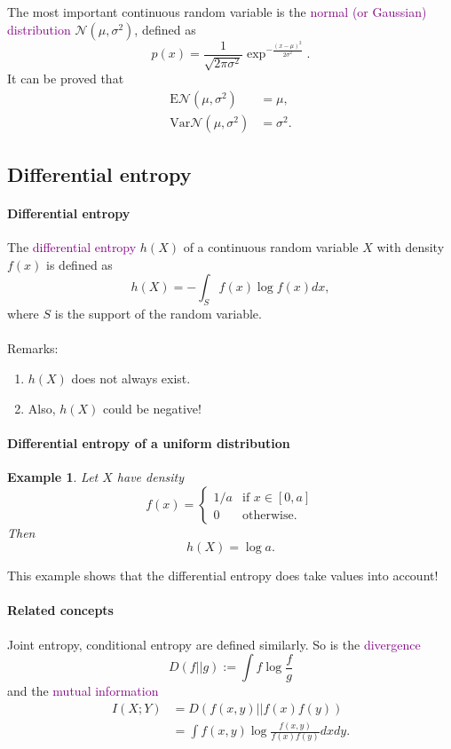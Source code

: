 \documentclass[a4paper, 11pt, openany]{book}
\numberwithin{equation}{section}
\theoremstyle{plain}
\newtheorem{example}	[equation]	{Example}
\theoremstyle{definition}
\newcommand{\Define}[1]{\textcolor{purple}{#1}}
\newcommand{\alphabet}[1]{\mathcal{#1}}
\begin{document}
The most important continuous random variable is the \Define{normal (or Gaussian) distribution} $\alphabet{N}(\mu, \sigma^2)$, defined as
\[
	p(x) = \frac{1}{\sqrt{2 \pi \sigma^2}} \exp^{- \frac{(x-\mu)^2}{2 \sigma^2}}.
\]
It can be proved that
\begin{align*}
	\mathrm{E} \alphabet{N}(\mu, \sigma^2) &= \mu,\\
	\mathrm{Var} \alphabet{N}(\mu, \sigma^2) &= \sigma^2.
\end{align*}




\subsection{Differential entropy}

\paragraph{Differential entropy}

The \Define{differential entropy} $h(X)$ of a continuous random variable $X$ with density $f(x)$ is defined as
\[
	h(X) = - \int_S f(x) \log f(x) dx,
\]
where $S$ is the support of the random variable.\\
~\\
Remarks:
\begin{enumerate}
	\item $h(X)$ does not always exist.
	
	\item Also, $h(X)$ could be negative!
\end{enumerate}




\paragraph{Differential entropy of a uniform distribution}
\begin{example}
Let $X$ have density
\[
	f(x) = \begin{cases}
	1/a & \mbox{if } x \in [0,a]\\
	0 & \mbox{otherwise}.
	\end{cases}
\]
Then
\[
	h(X) = \log a.
\]
\end{example}

This example shows that the differential entropy does take values into account!



\paragraph{Related concepts}
Joint entropy, conditional entropy are defined similarly. So is the \Define{divergence}
$$
	D(f||g) := \int f \log \frac{f}{g}
$$
and the \Define{mutual information}
\begin{align*}
	I(X;Y) &= D(f(x,y) || f(x)f(y))\\
	&= \int f(x,y) \log \frac{f(x,y)}{f(x)f(y)} dx dy.
\end{align*}
\end{document}
